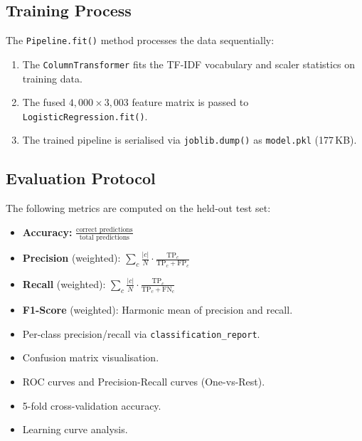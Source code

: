 \documentclass[12pt, a4paper, twoside]{article}
\newcommand{\code}[1]{\texttt{#1}}
\begin{document}
\subsection{Training Process}

The \code{Pipeline.fit()} method processes the data sequentially:

\begin{enumerate}[leftmargin=2em]
    \item The \code{ColumnTransformer} fits the TF-IDF vocabulary and
          scaler statistics on training data.
    \item The fused $4{,}000 \times 3{,}003$ feature matrix is passed
          to \code{LogisticRegression.fit()}.
    \item The trained pipeline is serialised via
          \code{joblib.dump()} as \code{model.pkl} (177\,KB).
\end{enumerate}

\subsection{Evaluation Protocol}

The following metrics are computed on the held-out test set:

\begin{itemize}[leftmargin=2em]
    \item \textbf{Accuracy:}
          $\frac{\text{correct predictions}}{\text{total predictions}}$
    \item \textbf{Precision} (weighted):
          $\sum_{c} \frac{|c|}{N} \cdot
          \frac{\text{TP}_c}{\text{TP}_c + \text{FP}_c}$
    \item \textbf{Recall} (weighted):
          $\sum_{c} \frac{|c|}{N} \cdot
          \frac{\text{TP}_c}{\text{TP}_c + \text{FN}_c}$
    \item \textbf{F1-Score} (weighted): Harmonic mean of precision and
          recall.
    \item Per-class precision/recall via
          \code{classification\_report}.
    \item Confusion matrix visualisation.
    \item ROC curves and Precision-Recall curves (One-vs-Rest).
    \item 5-fold cross-validation accuracy.
    \item Learning curve analysis.
\end{itemize}

\end{document}
